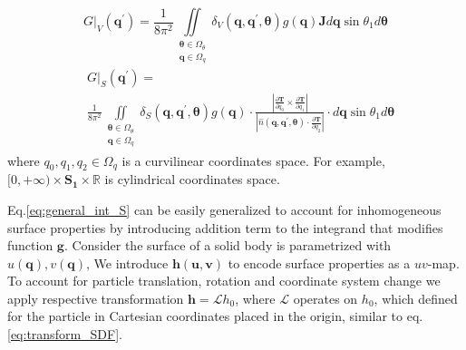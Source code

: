 \documentclass[10pt, a4paper]{article}
\begin{document}
\begin{multicols}{2}
\begin{equation}
    \left.G\right|_V (\bm{q}^{\prime}) = \frac{1}{8\pi^2} \iint 
        \limits_{\substack{
                            \bm{\theta} \in \Omega_{\theta} \\
                            \bm{q} \in \Omega_{q}}} 
        \delta_V(\bm{q}, \bm{q}^{\prime}, \bm{\theta}) g(\bm{q}) \bm{J} d \bm{q}  \sin \theta_1d \bm{\theta}
\end{equation}
\begin{equation}\label{eq:general_int_S}
    \begin{aligned}
    &\left.G\right|_S (\bm{q}^{\prime}) = \\ & \frac{1}{8\pi^2} \iint 
    \limits_{\substack{
        \bm{\theta} \in \Omega_{\theta} \\
        \bm{q} \in \Omega_{q}}}
    \delta_S(\bm{q}, \bm{q}^{\prime}, \bm{\theta}) g(\bm{q}) \cdot 
    \frac{\left|\frac{\partial \bm{T}}{\partial q_0} \times \frac{\partial \bm{T}}{\partial q_1} \right|}{\left|\hat{n}(\bm{q}, \bm{q}^{\prime}, \bm{\theta}) \cdot \frac{\partial\bm{T}}{\partial q_2}\right|} \cdot
    d\bm{q}  \sin \theta_1 d \bm{\theta}
    \end{aligned}
\end{equation}
where 
$q_0, q_1, q_2 \in \Omega_{q}$ is a curvilinear coordinates space. 
For example, $[0, +\infty) \times \bm{S_1} \times \mathbb{R}$ is cylindrical coordinates space.


Eq.\ref{eq:general_int_S} can be easily generalized to account for inhomogeneous surface properties by introducing addition term to the integrand that modifies function $\bm{g}$.
Consider the surface of a solid body is parametrized with $u(\bm{q}), v(\bm{q})$, 
We introduce $\bm{h}(\bm{u}, \bm{v})$ to encode surface properties as a $uv$-map.
To account for particle translation, rotation and coordinate system change we apply respective transformation $\bm{h} = \mathcal{L}{h}_0$, where $\mathcal{L}$ operates on $h_0$, which defined for the particle in Cartesian coordinates placed in the origin, similar to eq.\ref{eq:transform_SDF}.


\end{multicols}
\end{document}
